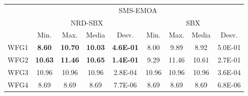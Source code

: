 \begin{table}[t]
\begin{center}
\begin{scriptsize}
\begin{tabular}{ccccccccc}
                           & \multicolumn{8}{c}{SMS-EMOA}                                                                                                                                                                                                                                                                                   \\ \cline{2-9} 
\multicolumn{1}{c|}{}      & \multicolumn{4}{c|}{NRD-SBX}                                                                                                                             & \multicolumn{4}{c|}{SBX}                                                                                                                             \\ \hline
\multicolumn{1}{|c|}{}     & \multicolumn{1}{c|}{Min.}            & \multicolumn{1}{c|}{Max.}            & \multicolumn{1}{c|}{Media}           & \multicolumn{1}{c|}{Desv.}               & \multicolumn{1}{c|}{Min.}           & \multicolumn{1}{c|}{Max.}           & \multicolumn{1}{c|}{Media}          & \multicolumn{1}{c|}{Desv.}               \\ \hline
\multicolumn{1}{|c|}{WFG1} & \multicolumn{1}{c|}{\textbf{8.60}}  & \multicolumn{1}{c|}{\textbf{10.70}} & \multicolumn{1}{c|}{\textbf{10.03}} & \multicolumn{1}{c|}{\textbf{4.6E-01}} & \multicolumn{1}{c|}{8.00}          & \multicolumn{1}{c|}{9.89}          & \multicolumn{1}{c|}{8.92}          & \multicolumn{1}{c|}{5.0E-01}          \\ \hline
\multicolumn{1}{|c|}{WFG2} & \multicolumn{1}{c|}{\textbf{10.63}} & \multicolumn{1}{c|}{\textbf{11.46}} & \multicolumn{1}{c|}{\textbf{10.65}} & \multicolumn{1}{c|}{\textbf{1.4E-01}} & \multicolumn{1}{c|}{9.29}          & \multicolumn{1}{c|}{11.46}         & \multicolumn{1}{c|}{10.61}         & \multicolumn{1}{c|}{2.7E-01}          \\ \hline
\multicolumn{1}{|c|}{WFG3} & \multicolumn{1}{c|}{10.96}          & \multicolumn{1}{c|}{10.96}          & \multicolumn{1}{c|}{10.96}          & \multicolumn{1}{c|}{2.8E-04}          & \multicolumn{1}{c|}{10.96}         & \multicolumn{1}{c|}{10.96}         & \multicolumn{1}{c|}{10.96}         & \multicolumn{1}{c|}{3.6E-04}          \\ \hline
\multicolumn{1}{|c|}{WFG4} & \multicolumn{1}{c|}{8.69}           & \multicolumn{1}{c|}{8.69}           & \multicolumn{1}{c|}{8.69}           & \multicolumn{1}{c|}{7.7E-06}          & \multicolumn{1}{c|}{8.69}          & \multicolumn{1}{c|}{8.69}          & \multicolumn{1}{c|}{8.69}          & \multicolumn{1}{c|}{6.8E-06}          \\ \hline

\end{tabular}
\end{scriptsize}
\end{center}
\end{table}
